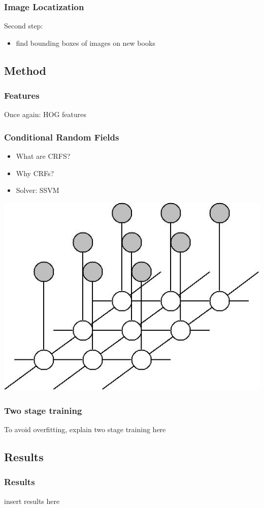 
\begin{frame}
\frametitle{Image Locatization}
Second step:
\begin{itemize}
\item find bounding boxes of images on new books
\end{itemize}
\end{frame}

\subsection{Method}
\begin{frame}
\frametitle{Features}
Once again: HOG features
\end{frame}


\begin{frame}
\frametitle{Conditional Random Fields}
\begin{itemize}
\item What are CRFS?
\item Why CRFs?
\item Solver: SSVM
\end{itemize}
\includegraphics[width=.5\paperwidth]{resources/crf}

\end{frame}

\begin{frame}
\frametitle{Two stage training}
To avoid overfitting, explain two stage training here
\end{frame}

\subsection{Results}

\begin{frame}
\frametitle{Results}
insert results here
\end{frame}

